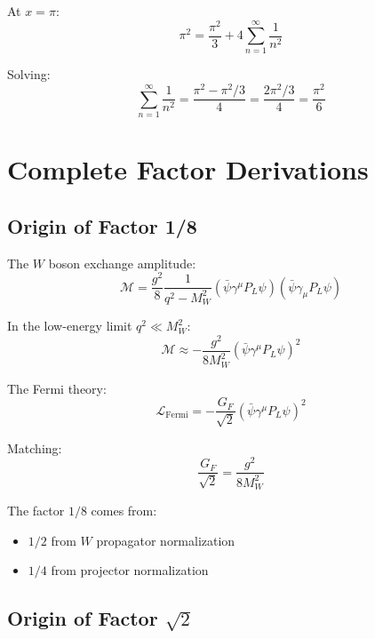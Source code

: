 \documentclass[11pt,a4paper]{article}
\begin{document}
At $x = \pi$:
\begin{equation}
\label{eq:fourier-pi}
\pi^2 = \frac{\pi^2}{3} + 4\sum_{n=1}^\infty \frac{1}{n^2}
\end{equation}

Solving:
\begin{equation}
\label{eq:zeta-2-fourier}
\sum_{n=1}^\infty \frac{1}{n^2} = \frac{\pi^2 - \pi^2/3}{4} = \frac{2\pi^2/3}{4} = \frac{\pi^2}{6}
\end{equation}

\section{Complete Factor Derivations}
\label{app:factor-derive}

\subsection{Origin of Factor 1/8}
\label{app:factor-8}

The $W$ boson exchange amplitude:
\begin{equation}
\label{eq:w-exchange}
\mathcal{M} = \frac{g^2}{8} \frac{1}{q^2 - M_W^2} (\bar{\psi}\gamma^\mu P_L \psi)(\bar{\psi}\gamma_\mu P_L \psi)
\end{equation}

In the low-energy limit $q^2 \ll M_W^2$:
\begin{equation}
\label{eq:low-energy-limit}
\mathcal{M} \approx -\frac{g^2}{8 M_W^2} (\bar{\psi}\gamma^\mu P_L \psi)^2
\end{equation}

The Fermi theory:
\begin{equation}
\label{eq:fermi-theory}
\mathcal{L}_{\text{Fermi}} = -\frac{G_F}{\sqrt{2}} (\bar{\psi}\gamma^\mu P_L \psi)^2
\end{equation}

Matching:
\begin{equation}
\label{eq:fermi-match}
\frac{G_F}{\sqrt{2}} = \frac{g^2}{8 M_W^2}
\end{equation}

The factor $1/8$ comes from:
\begin{itemize}
\item $1/2$ from $W$ propagator normalization
\item $1/4$ from projector normalization
\end{itemize}

\subsection{Origin of Factor $\sqrt{2}$}
\label{app:factor-sqrt2}
\end{document}
